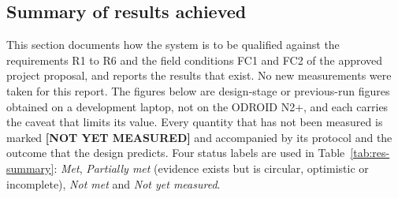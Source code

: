 \label{sec:results}
\providecommand{\nym}{\textbf{[NOT YET MEASURED]}}
\providecommand{\xh}{x_{\mathrm{h}}}

\subsection{Summary of results achieved} %
\label{sec:res-summary}

This section documents how the system is to be qualified against the requirements R1 to R6 and the field conditions FC1 and FC2 of the approved project proposal, and reports the results that exist.
No new measurements were taken for this report.
The figures below are design-stage or previous-run figures obtained on a development laptop, not on the ODROID N2+, and each carries the caveat that limits its value.
Every quantity that has not been measured is marked \nym{} and accompanied by its protocol and the outcome that the design predicts.
Four status labels are used in Table~\ref{tab:res-summary}: \emph{Met}, \emph{Partially met} (evidence exists but is circular, optimistic or incomplete), \emph{Not met} and \emph{Not yet measured}.

